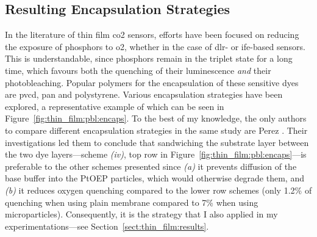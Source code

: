 \subsection{Resulting Encapsulation Strategies}\label{subsect:thin_film:encaps:strategies}

In the literature of thin film \gls{co2} sensors, efforts have been focused on reducing the exposure of phosphors to \gls{o2}, whether in the case of \gls{dlr}- or \gls{ife}-based sensors\cite{bultzingslowen2002, burke2006, cajlakovic2006, fernandezramos2018, perez2009}. This is understandable, since phosphors remain in the triplet state for a long time, which favours both the quenching of their luminescence \emph{and} their photobleaching. Popular polymers for the encapsulation of these sensitive dyes are \gls{pvcd}\cite{perez2009, fernandezramos2018}, \gls{pan}\cite{cajlakovic2006, cajlakovic2009} and polystyrene\cite{pfeifer2020}. Various encapsulation strategies have been explored, a representative example of which can be seen in Figure~\ref{fig:thin_film:pbl:encaps}. To the best of my knowledge, the only authors to compare different encapsulation strategies in the same study are Perez \etal{}\cite{perez2009}. Their investigations led them to conclude that sandwiching the substrate layer between the two dye layers---scheme \textit{(iv)}, top row in Figure~\ref{fig:thin_film:pbl:encaps}---is preferable to the other schemes presented since \textit{(a)} it prevents diffusion of the base buffer into the PtOEP particles, which would otherwise degrade them, and \textit{(b)} it reduces oxygen quenching compared to the lower row schemes (only 1.2\% of quenching when using plain membrane compared to 7\% when using microparticles). Consequently, it is the strategy that I also applied in my experimentations---see Section~\ref{sect:thin_film:results}.


